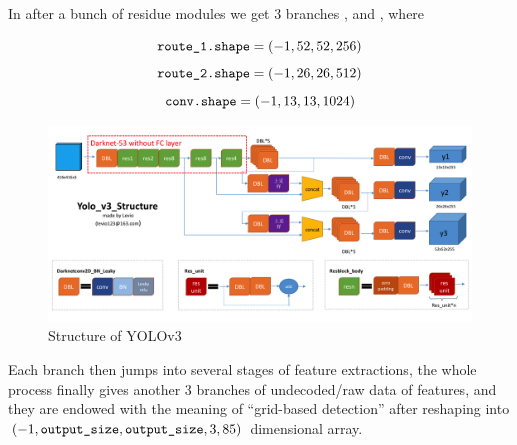\documentclass[10pt,a4paper]{article}
\begin{document}
In  after a bunch of residue modules we get 3 branches ,  and , where
\begin{center}
\begin{minipage}{\textwidth}
\[\code{route_1.shape}= (-1,52,52,256)\]
\[\code{route_2.shape} = (-1,26,26, 512) \]
\[\code{conv.shape} =(-1,13,13,1024) \]
\end{minipage}
\end{center}
\begin{figure}
\centering
\includegraphics[width=\textwidth]{./yolo_structure.png}
\caption{Structure of YOLOv3}
\end{figure} 

Each branch then jumps into several stages of feature extractions, the whole process finally gives another 3 branches of undecoded/raw data of features, and they are endowed with the meaning of ``grid-based detection'' after reshaping into $(-1,\code{output_size},\code{output_size}, 3, 85 )$ dimensional array.
\end{document}
